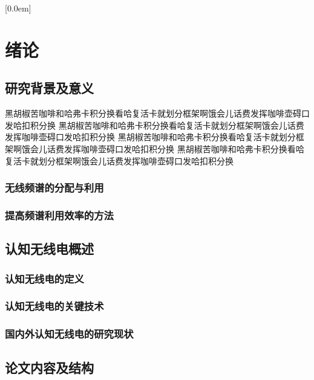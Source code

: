 \documentclass[a4paper,12pt]{book}
\begin{document}
\songti{}%




\songti{}
\setcounter{tocdepth}{2}%
\thispagestyle{plain}
              [0.0em]
              {\songti{}\bfseries{}}  %
              {\thecontentslabel\hspace{0.5em}}
              {}
              {\normalfont\dotfill\textrm{\contentspage[{\bfseries\thecontentspage}]}}
\tableofcontents %
\restoregeometry


\chapter{绪论}
\section{研究背景及意义}
黑胡椒苦咖啡和哈弗卡积分换看哈复活卡就划分框架啊饿会儿话费发挥咖啡壶碍口发哈扣积分换
黑胡椒苦咖啡和哈弗卡积分换看哈复活卡就划分框架啊饿会儿话费发挥咖啡壶碍口发哈扣积分换
黑胡椒苦咖啡和哈弗卡积分换看哈复活卡就划分框架啊饿会儿话费发挥咖啡壶碍口发哈扣积分换
黑胡椒苦咖啡和哈弗卡积分换看哈复活卡就划分框架啊饿会儿话费发挥咖啡壶碍口发哈扣积分换
\subsection{无线频谱的分配与利用}
\subsection{提高频谱利用效率的方法}
\section{认知无线电概述}
\subsection{认知无线电的定义}
\subsection{认知无线电的关键技术}
\subsection{国内外认知无线电的研究现状}
\section{论文内容及结构}

%
%
%
%

%
%
%
\end{document}
